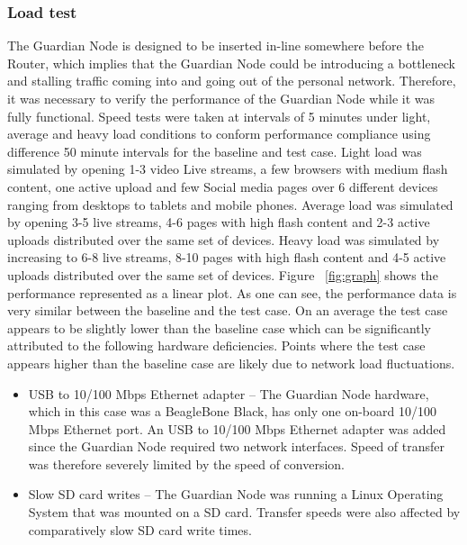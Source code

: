 \subsubsection{Load test}
\label{sec:eval:loadtest}
The Guardian Node is designed to be inserted in-line somewhere before the Router, which implies that the Guardian Node could be introducing a bottleneck and stalling traffic coming into and going out of the personal network. Therefore, it was necessary to verify the performance of the Guardian Node while it was fully functional. Speed tests were taken at intervals of 5 minutes under light, average and heavy load conditions to conform performance compliance using difference 50 minute intervals for the baseline and test case. Light load was simulated by opening 1-3 video Live streams, a few browsers with medium flash content, one active upload and few Social media pages over 6 different devices ranging from desktops to tablets and mobile phones. Average load was simulated by opening 3-5 live streams, 4-6 pages with high flash content and 2-3 active uploads distributed over the same set of devices. Heavy load was simulated by increasing to 6-8 live streams, 8-10 pages with high flash content and 4-5 active uploads distributed over the same set of devices. Figure ~\ref{fig:graph} shows the performance represented as a linear plot. As one can see, the performance data is very similar between the baseline and the test case. On an average the test case appears to be slightly lower than the baseline case which can be significantly attributed to the following hardware deficiencies. Points where the test case appears higher than the baseline case are likely due to network load fluctuations.
\begin{itemize}
    \item USB to 10/100 Mbps Ethernet adapter --
    The Guardian Node hardware, which in this case was a BeagleBone Black, has only one on-board 10/100 Mbps Ethernet port. An USB to 10/100 Mbps Ethernet adapter was added since the Guardian Node required two network interfaces. Speed of transfer was therefore severely limited by the speed of conversion.
    \item Slow SD card writes --
    The Guardian Node was running a Linux Operating System that was mounted on a SD card. Transfer speeds were also affected by comparatively slow SD card write times.
\end{itemize}

